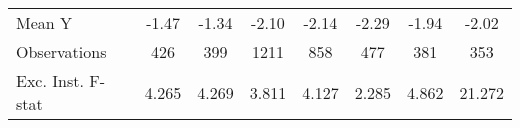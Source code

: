 {\begin{tabular}{l*{7}{c}}
\midrule
Mean Y      &       -1.47         &       -1.34         &       -2.10         &       -2.14         &       -2.29         &       -1.94         &       -2.02         \\
Observations&         426         &         399         &        1211         &         858         &         477         &         381         &         353         \\
Exc. Inst. F-stat&       4.265         &       4.269         &       3.811         &       4.127         &       2.285         &       4.862         &      21.272         \\
\bottomrule
\end{tabular}
}
